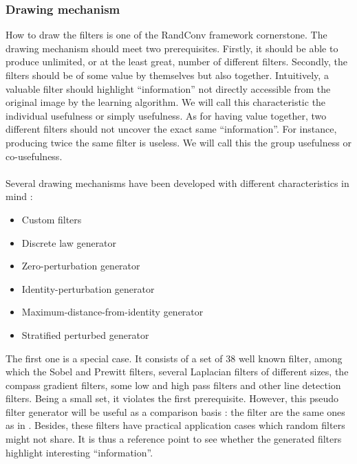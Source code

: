 \documentclass[a4paper]{report}
\begin{document}
			
			
			\subsubsection{Drawing mechanism}
			How to draw the filters is one of the RandConv framework cornerstone. The drawing mechanism should meet two prerequisites. Firstly, it should be able to produce unlimited, or at the least great, number of different filters. Secondly, the filters should be of some value by themselves but also together. Intuitively, a valuable filter should highlight ``information'' not directly accessible from the original image by the learning algorithm. We will call this characteristic the individual usefulness or simply usefulness. As for having value together, two different filters should not uncover the exact same ``information''. For instance, producing twice the same filter is useless. We will call this the group usefulness or co-usefulness.
			
			\paragraph{}
			Several drawing mechanisms have been developed with different characteristics in mind :
			
			\begin{itemize}
				\item Custom filters
				\item Discrete law generator
				\item Zero-perturbation generator
				\item Identity-perturbation generator
				\item Maximum-distance-from-identity generator
				\item Stratified perturbed generator
			\end{itemize}
			
			The first one is a special case. It consists of a set of 38 well known filter, among which the Sobel and Prewitt filters, several Laplacian filters of different sizes, the compass gradient filters, some low and high pass filters and other line detection filters.
			Being a small set, it violates the first prerequisite. However, this pseudo filter generator will be useful as a comparison basis : the filter are the same ones as in \cite{}. Besides, these filters have practical application cases which random filters might not share. It is thus a reference point to see whether the generated filters highlight interesting ``information''.
\end{document}

